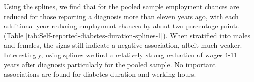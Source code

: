 Using the splines, we find that for the pooled sample employment chances
are reduced for those reporting a diagnosis more than eleven years
ago, with each additional year reducing employment chances by about
two percentage points (Table \ref{tab:Self-reported-diabetes-duration-splines-1}).
When stratified into males and females, the signs still indicate a
negative association, albeit much weaker. Interestingly, using splines
we find a relatively strong reduction of wages 4-11 years after diagnosis
particularly for the pooled sample. No important associations are
found for diabetes duration and working hours.
\begin{table}[h!]
\end{table}
